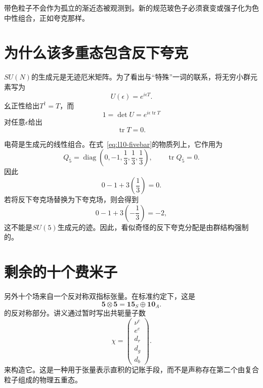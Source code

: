 带色粒子不会作为孤立的渐近态被观测到。新的规范玻色子必须衰变或强子化为色中性组合，正如夸克那样。

\section{为什么该多重态包含反下夸克}

\(SU(N)\)的生成元是无迹厄米矩阵。为了看出与“特殊”一词的联系，将无穷小群元素写为
\begin{equation}
U(\epsilon)=e^{i\epsilon T}.
\end{equation}
幺正性给出\(T^\dagger=T\)，而
\begin{equation}
1=\det U=e^{i\epsilon\operatorname{tr}T}
\end{equation}
对任意\(\epsilon\)给出
\begin{equation}
\operatorname{tr}T=0.
\label{eq:l10-traceless-generator}
\end{equation}

电荷是生成元的线性组合。在式~\eqref{eq:l10-fivebar}的物质列上，它作用为
\begin{equation}
Q_{\overline5}
=
\operatorname{diag}
\left(0,-1,\frac13,\frac13,\frac13\right),
\qquad
\operatorname{tr}Q_{\overline5}=0.
\label{eq:l10-charge-fivebar}
\end{equation}
因此
\begin{equation}
0-1+3\left(\frac13\right)=0.
\end{equation}
若将反下夸克场替换为下夸克场，则会得到
\begin{equation}
0-1+3\left(-\frac13\right)=-2,
\end{equation}
这不能是\(SU(5)\)生成元的迹。因此，看似奇怪的反下夸克分配是由群结构强制的。

\section{剩余的十个费米子}

另外十个场来自一个反对称双指标张量。在标准约定下，这是
\begin{equation}
\mathbf5\otimes\mathbf5
=\mathbf{15}_S\oplus\mathbf{10}_A.
\label{eq:l10-five-five}
\end{equation}
的反对称部分。讲义通过暂时写出共轭量子数
\begin{equation}
\chi=
\begin{pmatrix}
\nu^c\\
e^c\\
d_r\\
d_g\\
d_b
\end{pmatrix}.
\label{eq:l10-aux-five}
\end{equation}
来构造它。这是一种用于张量表示直积的记账手段，而不是声称存在第二个由复合粒子组成的物理五重态。

